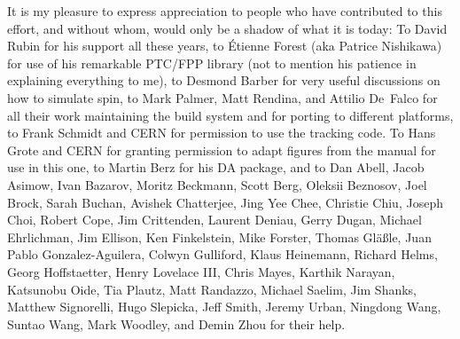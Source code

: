 It is my pleasure to express appreciation to people who have contributed to this effort, and without
whom, \bmad would only be a shadow of what it is today: To David Rubin for his support all these
years, to \'Etienne Forest (aka Patrice Nishikawa) for use of his remarkable PTC/FPP library (not to
mention his patience in explaining everything to me), to Desmond Barber for very useful discussions
on how to simulate spin, to Mark Palmer, Matt Rendina, and Attilio De~Falco for all their work
maintaining the build system and for porting \bmad to different platforms, to Frank Schmidt and CERN
for permission to use the \mad tracking code. To Hans Grote and CERN for granting permission to
adapt figures from the \mad manual for use in this one, to Martin Berz for his DA package, and to
Dan Abell, Jacob Asimow, Ivan Bazarov, Moritz Beckmann, Scott Berg, Oleksii Beznosov, Joel Brock,
Sarah Buchan, Avishek Chatterjee, Jing Yee Chee, Christie Chiu, Joseph Choi, Robert Cope, Jim
Crittenden, Laurent Deniau, Gerry Dugan, Michael Ehrlichman, Jim Ellison, Ken Finkelstein, Mike
Forster, Thomas Gl{\"a}{\ss}le, Juan Pablo Gonzalez-Aguilera, Colwyn Gulliford, Klaus Heinemann,
Richard Helms, Georg Hoffstaetter, Henry Lovelace III, Chris Mayes, Karthik Narayan, Katsunobu Oide,
Tia Plautz, Matt Randazzo, Michael Saelim, Jim Shanks, Matthew Signorelli, Hugo Slepicka, Jeff
Smith, Jeremy Urban, Ningdong Wang, Suntao Wang, Mark Woodley, and Demin Zhou for their help.

